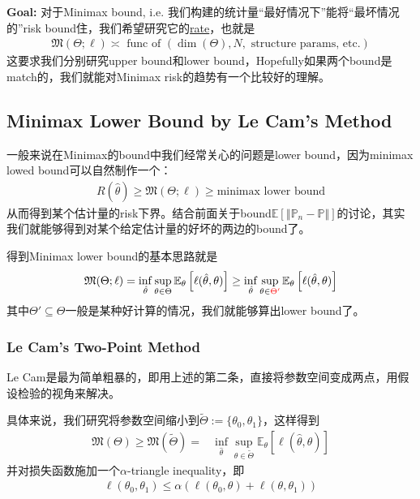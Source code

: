 \documentclass[11pt,a4paper]{ctexart}
\numberwithin{equation}{section}%
\begin{document}
{\color{red}\textbf{Goal:}} 对于Minimax bound, i.e. 我们构建的统计量“最好情况下”能将“最坏情况的”risk bound住，我们希望研究它的\uline{rate}，也就是
\begin{align*}
    \mathfrak{M}(\Theta;\ell) \asymp \text{ func of }( \dim(\Theta),N,\text{ structure params, etc.})
\end{align*}
这要求我们分别研究upper bound和lower bound，Hopefully如果两个bound是match的，我们就能对Minimax risk的趋势有一个比较好的理解。



\subsection{Minimax Lower Bound by Le Cam's Method}\label{subsec:LeCam}


一般来说在Minimax的bound中我们经常关心的问题是lower bound，因为minimax lowed bound可以自然制作一个：
\begin{align*}
    R(\hat{\theta })\geq \mathfrak{M}(\Theta;\ell) \geq \text{minimax lower bound}
\end{align*}
从而得到某个估计量的risk下界。结合前面关于bound$ \mathbb{E}\left[ \left\Vert \mathbb{P}_n-\mathbb{P} \right\Vert  \right]  $的讨论，其实我们就能够得到对某个给定估计量的好坏的两边的bound了。

得到Minimax lower bound的基本思路就是
\begin{align*}
    \mathfrak{M}(\Theta;\ell) = \mathop{ \inf  }\limits_{\hat{\theta }} \mathop{ \sup  }\limits_{\theta \in \Theta} \mathbb{E}_\theta\left[ \ell(\hat{\theta},\theta) \right] \geq \mathop{ \inf  }\limits_{\hat{\theta }} \mathop{ \sup  }\limits_{\theta \in {\color{red}\Theta '}} \mathbb{E}_\theta\left[ \ell(\hat{\theta},\theta) \right] 
\end{align*}
其中$ \Theta' \subseteq \Theta $一般是某种好计算的情况，我们就能够算出lower bound了。







\subsubsection{Le Cam's Two-Point Method}

Le Cam是最为简单粗暴的，即用上述的第二条，直接将参数空间变成两点，用假设检验的视角来解决。

具体来说，我们研究将参数空间缩小到$ \tilde{\Theta}:= \{\theta _0, \theta _1\} $，这样得到
\begin{align*}
    \mathfrak{M}(\Theta)\geq \mathfrak{M}(\tilde{\Theta}) =& \mathop{ \inf  }\limits_{\hat{\theta }} \mathop{ \sup  }\limits_{\theta \in \tilde{\Theta}} \mathbb{E}_\theta\left[ \ell(\hat{\theta},\theta) \right] 
\end{align*}
并对损失函数施加一个$ \alpha  $-triangle inequality，即
\begin{align*}
    \ell(\theta _0,\theta _1)\leq \alpha \left(\ell(\theta _0, \theta ) + \ell(\theta , \theta _1)\right) 
\end{align*}
\end{document}
